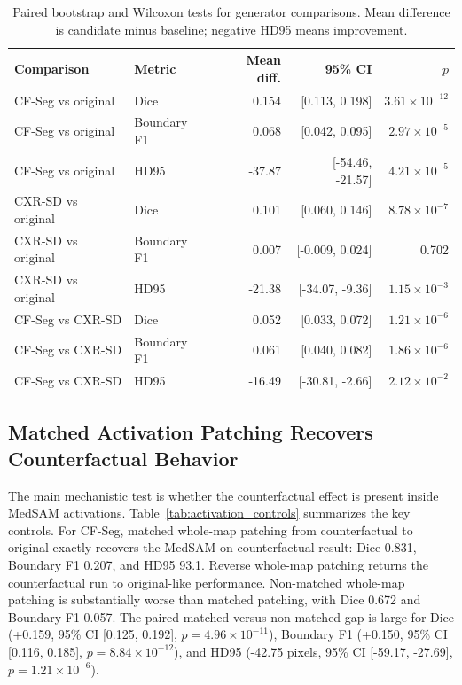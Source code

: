 \documentclass[runningheads]{llncs}
\begin{document}
\begin{table}
\centering
\caption{Paired bootstrap and Wilcoxon tests for generator comparisons. Mean difference is candidate minus baseline; negative HD95 means improvement.}
\label{tab:bootstrap}
\scriptsize
\setlength{\tabcolsep}{3.5pt}
\begin{tabular}{llrrr}
\toprule
Comparison & Metric & Mean diff. & 95\% CI & $p$ \\
\midrule
CF-Seg vs original & Dice & 0.154 & [0.113, 0.198] & $3.61{\times}10^{-12}$ \\
CF-Seg vs original & Boundary F1 & 0.068 & [0.042, 0.095] & $2.97{\times}10^{-5}$ \\
CF-Seg vs original & HD95 & -37.87 & [-54.46, -21.57] & $4.21{\times}10^{-5}$ \\
CXR-SD vs original & Dice & 0.101 & [0.060, 0.146] & $8.78{\times}10^{-7}$ \\
CXR-SD vs original & Boundary F1 & 0.007 & [-0.009, 0.024] & 0.702 \\
CXR-SD vs original & HD95 & -21.38 & [-34.07, -9.36] & $1.15{\times}10^{-3}$ \\
CF-Seg vs CXR-SD & Dice & 0.052 & [0.033, 0.072] & $1.21{\times}10^{-6}$ \\
CF-Seg vs CXR-SD & Boundary F1 & 0.061 & [0.040, 0.082] & $1.86{\times}10^{-6}$ \\
CF-Seg vs CXR-SD & HD95 & -16.49 & [-30.81, -2.66] & $2.12{\times}10^{-2}$ \\
\bottomrule
\end{tabular}
\end{table}

\subsection{Matched Activation Patching Recovers Counterfactual Behavior}

The main mechanistic test is whether the counterfactual effect is present inside MedSAM activations. Table~\ref{tab:activation_controls} summarizes the key controls. For CF-Seg, matched whole-map patching from counterfactual to original exactly recovers the MedSAM-on-counterfactual result: Dice 0.831, Boundary F1 0.207, and HD95 93.1. Reverse whole-map patching returns the counterfactual run to original-like performance. Non-matched whole-map patching is substantially worse than matched patching, with Dice 0.672 and Boundary F1 0.057. The paired matched-versus-non-matched gap is large for Dice (+0.159, 95\% CI [0.125, 0.192], $p=4.96{\times}10^{-11}$), Boundary F1 (+0.150, 95\% CI [0.116, 0.185], $p=8.84{\times}10^{-12}$), and HD95 (-42.75 pixels, 95\% CI [-59.17, -27.69], $p=1.21{\times}10^{-6}$).
\end{document}
